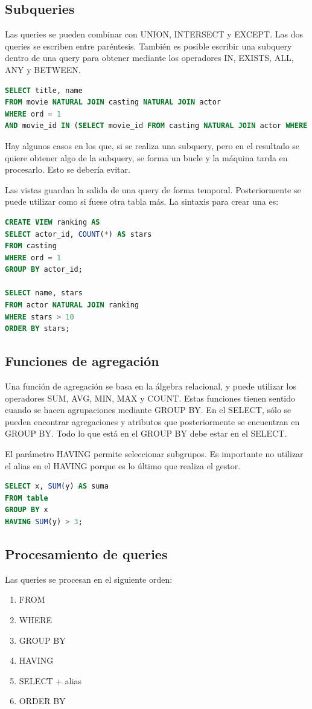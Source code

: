 \subsection{Subqueries}
Las queries se pueden combinar con UNION, INTERSECT y EXCEPT. Las dos queries se escriben entre paréntesis. También es posible escribir una subquery dentro de una query para obtener mediante los operadores IN, EXISTS, ALL, ANY y BETWEEN.
\begin{lstlisting}[language=SQL]
SELECT title, name
FROM movie NATURAL JOIN casting NATURAL JOIN actor
WHERE ord = 1
AND movie_id IN (SELECT movie_id FROM casting NATURAL JOIN actor WHERE name = 'Julie Andrews')
\end{lstlisting}

Hay algunos casos en los que, si se realiza una subquery, pero en el resultado se quiere obtener algo de la subquery, se forma un bucle y la máquina tarda en procesarlo. Esto se debería evitar. 

Las vistas guardan la salida de una query de forma temporal. Posteriormente se puede utilizar como si fuese otra tabla más. La sintaxis para crear una es:
\begin{lstlisting}[language=SQL]
CREATE VIEW ranking AS
SELECT actor_id, COUNT(*) AS stars
FROM casting
WHERE ord = 1
GROUP BY actor_id;

SELECT name, stars
FROM actor NATURAL JOIN ranking
WHERE stars > 10
ORDER BY stars; 
\end{lstlisting}

\subsection{Funciones de agregación}
Una función de agregación se basa en la álgebra relacional, y puede utilizar los operadores SUM, AVG, MIN, MAX y COUNT. Estas funciones tienen sentido cuando se hacen agrupaciones mediante GROUP BY. En el SELECT, sólo se pueden encontrar agregaciones y atributos que posteriormente se encuentran en GROUP BY. Todo lo que está en el GROUP BY debe estar en el SELECT.

El parámetro HAVING permite seleccionar subgrupos. Es importante no utilizar el alias en el HAVING porque es lo último que realiza el gestor.
\begin{lstlisting}[language=SQL]
SELECT x, SUM(y) AS suma
FROM table
GROUP BY x
HAVING SUM(y) > 3;
\end{lstlisting}

\subsection{Procesamiento de queries}
Las queries se procesan en el siguiente orden:
\begin{enumerate}
\item FROM
\item WHERE
\item GROUP BY
\item HAVING
\item SELECT + alias
\item ORDER BY
\end{enumerate}

